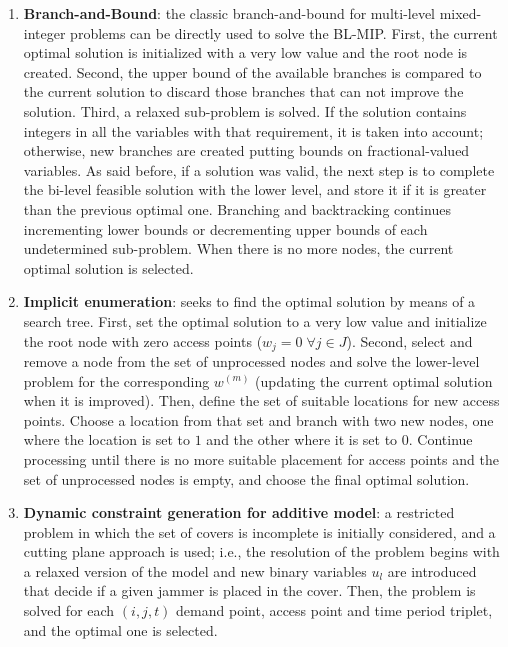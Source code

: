 \documentclass[runningheads]{llncs}
\begin{document}
\begin{enumerate}
  \item \textbf{Branch-and-Bound}: the classic branch-and-bound for multi-level mixed-integer problems can be directly used to solve the BL-MIP. First, the current optimal solution is initialized with a very low value and the root node is created. Second, the upper bound of the available branches is compared to the current solution to discard those branches that can not improve the solution. Third, a relaxed sub-problem is solved. If the solution contains integers in all the variables with that requirement, it is taken into account; otherwise, new branches are created putting bounds on fractional-valued variables. As said before, if a solution was valid, the next step is to complete the bi-level feasible solution with the lower level, and store it if it is greater than the previous optimal one. Branching and backtracking continues incrementing lower bounds or decrementing upper bounds of each undetermined sub-problem. When there is no more nodes, the current optimal solution is selected.
  
  \item \textbf{Implicit enumeration}: seeks to find the optimal solution by means of a search tree. First, set the optimal solution to a very low value and initialize the root node with zero access points ($w_j=0 \; \forall j \in J$). Second, select and remove a node from the set of unprocessed nodes and solve the lower-level problem for the corresponding $w^(m)$ (updating the current optimal solution when it is improved). Then, define the set of suitable locations for new access points. Choose a location from that set and branch with two new nodes, one where the location is set to $1$ and the other where it is set to $0$. Continue processing until there is no more suitable placement for access points and the set of unprocessed nodes is empty, and choose the final optimal solution.
  
  \item \textbf{Dynamic constraint generation for additive model}: a restricted problem in which the set of covers is incomplete is initially considered, and a cutting plane approach is used; i.e., the resolution of the problem begins with a relaxed version of the model and new binary variables $u_l$ are introduced that decide if a given jammer is placed in the cover. Then, the problem is solved for each $(i,j,t)$ demand point, access point and time period triplet, and the optimal one is selected.
\end{enumerate}
\end{document}
